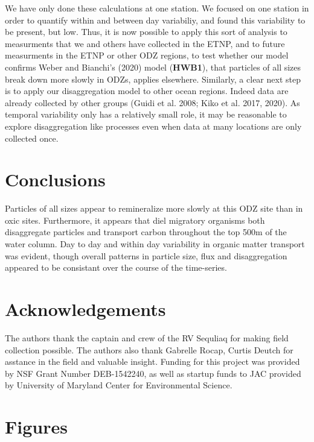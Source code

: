 \documentclass[]{article}
\begin{document}
We have only done these calculations at one station. We focused on one
station in order to quantify within and between day variabiliy, and
found this variability to be present, but low. Thus, it is now possible
to apply this sort of analysis to measurments that we and others have
collected in the ETNP, and to future measurments in the ETNP or other
ODZ regions, to test whether our model confirms Weber and Bianchi's
(2020) model (\textbf{HWB1}), that particles of all sizes break down
more slowly in ODZs, applies elsewhere. Similarly, a clear next step is
to apply our disaggregation model to other ocean regions. Indeed data
are already collected by other groups (Guidi et al. 2008; Kiko et al.
2017, 2020). As temporal variability only has a relatively small role,
it may be reasonable to explore disaggregation like processes even when
data at many locations are only collected once.

\hypertarget{conclusions}{%
\section{Conclusions}\label{conclusions}}

Particles of all sizes appear to remineralize more slowly at this ODZ
site than in oxic sites. Furthermore, it appears that diel migratory
organisms both disaggregate particles and transport carbon throughout
the top 500m of the water column. Day to day and within day variability
in organic matter transport was evident, though overall patterns in
particle size, flux and disaggregation appeared to be consistant over
the course of the time-series.

\hypertarget{acknowledgements}{%
\section{Acknowledgements}\label{acknowledgements}}

The authors thank the captain and crew of the RV Sequliaq for making
field collection possible. The authors also thank Gabrelle Rocap, Curtis
Deutch for asstance in the field and valuable insight. Funding for this
project was provided by NSF Grant Number DEB-1542240, as well as startup
funds to JAC provided by University of Maryland Center for Environmental
Science.

\hypertarget{figures}{%
\section{Figures}\label{figures}}
\end{document}
